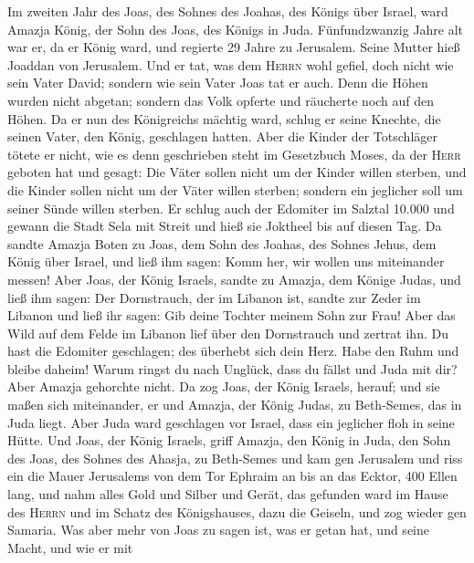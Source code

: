  Im zweiten Jahr des Joas, des Sohnes des Joahas, des
Königs über Israel, ward Amazja König, der Sohn des Joas, des Königs in
Juda.  Fünfundzwanzig Jahre alt war er, da er König ward,
und regierte 29 Jahre zu Jerusalem. Seine Mutter hieß Joaddan von
Jerusalem.  Und er tat, was dem \textsc{Herrn} wohl
gefiel, doch nicht wie sein Vater David; sondern wie sein Vater Joas tat
er auch.  Denn die Höhen wurden nicht abgetan; sondern das
Volk opferte und räucherte noch auf den Höhen.  Da er nun
des Königreichs mächtig ward, schlug er seine Knechte, die seinen Vater,
den König, geschlagen hatten.  Aber die Kinder der
Totschläger tötete er nicht, wie es denn geschrieben steht im Gesetzbuch
Moses, da der \textsc{Herr} geboten hat und gesagt: Die Väter sollen
nicht um der Kinder willen sterben, und die Kinder sollen nicht um der
Väter willen sterben; sondern ein jeglicher soll um seiner Sünde willen
sterben.  Er schlug auch der Edomiter im Salztal 10.000
und gewann die Stadt Sela mit Streit und hieß sie Joktheel bis auf
diesen Tag.  Da sandte Amazja Boten zu Joas, dem Sohn des
Joahas, des Sohnes Jehus, dem König über Israel, und ließ ihm sagen:
Komm her, wir wollen uns miteinander messen!  Aber Joas,
der König Israels, sandte zu Amazja, dem Könige Judas, und ließ ihm
sagen: Der Dornstrauch, der im Libanon ist, sandte zur Zeder im Libanon
und ließ ihr sagen: Gib deine Tochter meinem Sohn zur Frau! Aber das
Wild auf dem Felde im Libanon lief über den Dornstrauch und zertrat ihn.
 Du hast die Edomiter geschlagen; des überhebt sich dein
Herz. Habe den Ruhm und bleibe daheim! Warum ringst du nach Unglück,
dass du fällst und Juda mit dir?  Aber Amazja gehorchte
nicht. Da zog Joas, der König Israels, herauf; und sie maßen sich
miteinander, er und Amazja, der König Judas, zu Beth-Semes, das in Juda
liegt.  Aber Juda ward geschlagen vor Israel, dass ein
jeglicher floh in seine Hütte.  Und Joas, der König
Israels, griff Amazja, den König in Juda, den Sohn des Joas, des Sohnes
des Ahasja, zu Beth-Semes und kam gen Jerusalem und riss ein die Mauer
Jerusalems von dem Tor Ephraim an bis an das Ecktor, 400 Ellen lang,
 und nahm alles Gold und Silber und Gerät, das gefunden
ward im Hause des \textsc{Herrn} und im Schatz des Königshauses, dazu
die Geiseln, und zog wieder gen Samaria.  Was aber mehr
von Joas zu sagen ist, was er getan hat, und seine Macht, und wie er mit
